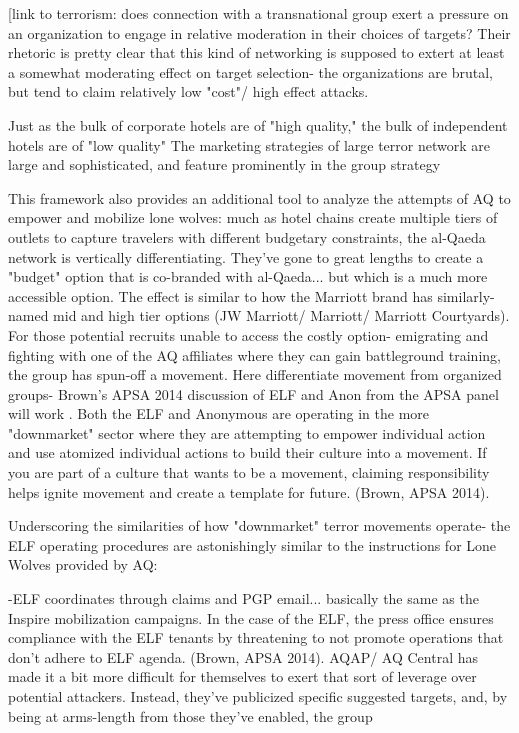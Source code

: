 \documentclass{article}
\begin{document}
[link to terrorism: does connection with a transnational group exert a
pressure on an organization to engage in relative moderation in their
choices of targets? Their rhetoric is pretty clear that this kind of
networking is supposed to extert at least a somewhat moderating effect
on target selection- the organizations are brutal, but tend to claim
relatively low "cost"/ high effect attacks.  

Just as the bulk of corporate hotels are of "high quality," the bulk of independent hotels are of "low quality"
 The marketing strategies of large terror network are large and sophisticated, and feature prominently in the group strategy 

This framework also provides an additional tool to analyze the attempts of AQ to empower and mobilize lone wolves: much as hotel chains create multiple tiers of outlets to capture travelers with different budgetary constraints, the al-Qaeda network is vertically differentiating. They've gone to great lengths to create a "budget" option that is co-branded with al-Qaeda... but which is a much more accessible option. The effect is similar to how the Marriott brand has similarly-named mid and high tier options (JW Marriott/ Marriott/ Marriott Courtyards). For those potential recruits unable to access the costly option- emigrating and fighting with one of the AQ affiliates where they can gain battleground training, the group has spun-off a movement. Here differentiate movement from organized groups- Brown's APSA 2014 discussion of ELF and Anon from the APSA panel will work .  Both the ELF and Anonymous are operating in the more "downmarket" sector where they are attempting to empower individual action and  use atomized individual actions to build their culture into a movement.  If you are part of a culture that wants to be a movement, claiming responsibility helps ignite movement and create a template for future. (Brown, APSA 2014). 
 
Underscoring the similarities of how "downmarket" terror movements operate- the ELF operating procedures are astonishingly similar to the instructions for Lone Wolves provided by AQ:

-ELF coordinates through claims and PGP email... basically the same as
the Inspire mobilization campaigns. In the case of the ELF, the press
office ensures compliance with the ELF tenants by threatening to not
promote operations that don't adhere to ELF agenda. (Brown, APSA
2014).  AQAP/ AQ Central has made it a bit more difficult for
themselves  to exert that sort of leverage over potential
attackers. Instead, they've publicized specific suggested targets,
and, by being at arms-length from those they've enabled, the group
\end{document}
